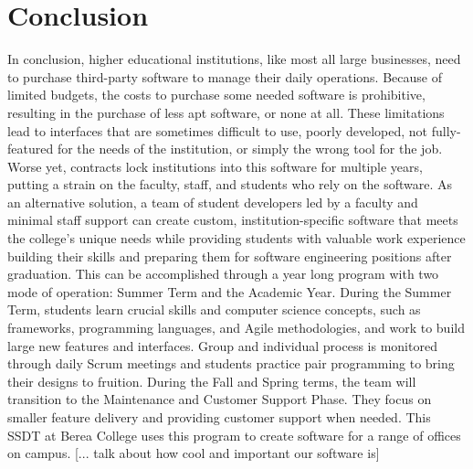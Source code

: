 \section{Conclusion}
In conclusion, higher educational institutions, like most all large businesses, need to purchase third-party software to manage their daily operations. Because of limited budgets, the costs to purchase some needed software is prohibitive, resulting in the purchase of less apt software, or none at all. These limitations lead to interfaces that are sometimes difficult to use, poorly developed, not fully-featured for the needs of the institution, or simply the wrong tool for the job. Worse yet, contracts lock institutions into this software for multiple years, putting a strain on the faculty, staff, and students who rely on the software. As an alternative solution, a team of student developers led by a faculty and minimal staff support can create custom, institution-specific software that meets the college's unique needs while providing students with valuable work experience building their skills and preparing them for software engineering positions after graduation. This can be accomplished through a year long program with two mode of operation: Summer Term and the Academic Year. During the Summer Term, students learn crucial skills and computer science concepts, such as frameworks, programming languages, and Agile methodologies, and work to build large new features and interfaces. Group and individual process is monitored through daily Scrum meetings and students practice pair programming to bring their designs to fruition. During the Fall and Spring terms, the team will transition to the Maintenance and Customer Support Phase. They focus on smaller feature delivery and providing customer support when needed. This SSDT at Berea College uses this program to create software for a range of offices on campus. [... talk about how cool and important our software is]